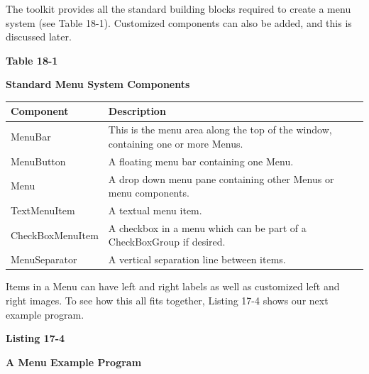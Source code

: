 The toolkit provides all the standard building blocks required to create
a menu system (see Table 18-1). Customized components can
also be added, and this is discussed later.

\bigskip

{\centering\sffamily\bfseries
Table 18-1
\par}

{\centering\sffamily\bfseries
Standard Menu System Components
\par}

\begin{flushleft}
\tablehead{}
\begin{supertabular}{|m{1.6906599in}|m{4.1518598in}|}
\hline
\sffamily\bfseries Component &
\sffamily\bfseries Description\\\hline
\sffamily MenuBar &
This is the menu area along the top of the window, containing one or
more \textsf{Menu}s.\\\hline
\sffamily MenuButton &
A floating menu bar containing one \textsf{Menu}.\\\hline
\sffamily Menu &
A drop down menu pane containing other \textsf{Menu}s or menu
components.\\\hline
\sffamily TextMenuItem &
A textual menu item.\\\hline
\ttfamily \textsf{CheckBoxMenuItem}  &
A checkbox in a menu which can be part of a \textsf{CheckBoxGroup} if
desired.\\\hline
\sffamily MenuSeparator &
A vertical separation line between items.\\\hline
\end{supertabular}
\end{flushleft}
Items in a \textsf{Menu} can have left and right labels as well as
customized left and right images. To see how this all fits together,
Listing 17-4 shows our next example program.

\bigskip

{\sffamily\bfseries
Listing 17-4}

{\sffamily\bfseries
A Menu Example Program}

